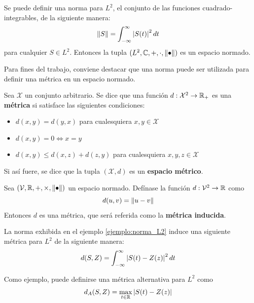 \begin{ejemplo}
Se puede definir una norma para $L^{2}$, el conjunto de las funciones cuadrado-integrables, de la siguiente manera:
\begin{equation}
\left\Vert S \right\Vert = \int_{-\infty}^{\infty} \left| S(t) \right|^{2} dt
\end{equation} 
para cualquier $S \in L^{2}$. Entonces la tupla $(L^{2},\mathbb{C},+,\cdot,\left\Vert \bullet \right\Vert)$ es un espacio normado.
\label{ejemplo:norma_L2}
\end{ejemplo}

Para fines del trabajo, conviene destacar que una norma puede ser utilizada para definir una métrica en un espacio normado.
%

\begin{definicion}
Sea $\mathcal{X}$ un conjunto arbitrario. Se dice que una función $d: \mathcal{X}^{2}\rightarrow \mathbb{R}_+$ es una \textbf{métrica} si satisface las siguientes condiciones:
\begin{itemize}
\item $d(x,y) = d(y,x)$ para cualesquiera $x,y \in \mathcal{X}$
\item $d(x,y)=0 \Leftrightarrow x=y$
\item $d(x,y) \leq d(x,z) + d(z,y)$ para cualesquiera $x,y,z \in \mathcal{X}$
\end{itemize}
Si así fuere, se dice que la tupla $(\mathcal{X},d)$ es un \textbf{espacio métrico}.
\end{definicion}

\begin{proposicion}
Sea $(\mathcal{V},\mathbb{R},+,\times, \left\Vert \bullet \right\Vert)$ un espacio normado. Defínase la función $d: \mathcal{V}^{2} \rightarrow \mathbb{R}$ como
\begin{equation}
d(u,v) = \left\Vert u-v \right\Vert
\end{equation}
Entonces $d$ es una métrica, que será referida como la \textbf{métrica inducida}.
\end{proposicion}

\begin{ejemplo}
La norma exhibida en el ejemplo \ref{ejemplo:norma_L2} induce una siguiente métrica para $L^{2}$ de la siguiente manera:
\begin{equation}
d(S,Z) = \int_{-\infty}^{\infty} \left| S(t) - Z(z) \right|^{2} dt
\end{equation}

Como ejemplo, puede definirse una métrica alternativa para $L^{2}$ como
\begin{equation}
d_A(S,Z) = \max_{t \in \mathbb{R}} \left| S(t) - Z(z) \right|
\end{equation}
\end{ejemplo}

